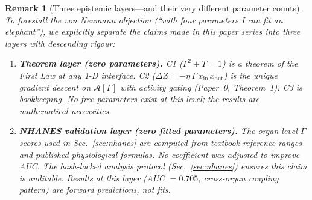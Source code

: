 \documentclass[aps,pre,twocolumn,superscriptaddress,floatfix]{revtex4-2}
\newtheorem{remark}{Remark}
\begin{document}
\begin{remark}[Three epistemic layers---and their
  very different parameter counts]
\label{rem:epistemic-layers}
To forestall the von Neumann objection
(``with four parameters I can fit an elephant''),
we explicitly separate the claims made in this
paper series into three layers with descending
rigour:

\begin{enumerate}
  \item \textbf{Theorem layer (zero parameters).}
    C1 ($\Gamma^2 + T = 1$) is a theorem of the
    First Law at any 1-D interface.
    C2 ($\Delta Z = -\eta\,\Gamma\,x_{\text{in}}\,
    x_{\text{out}}$) is the unique gradient descent
    on $\mathcal{A}[\Gamma]$ with activity gating
    (Paper~0, Theorem~1).
    C3 is bookkeeping.
    No free parameters exist at this level;
    the results are mathematical necessities.

  \item \textbf{NHANES validation layer
    (zero fitted parameters).}
    The organ-level $\Gamma$ scores used in
    Sec.~\ref{sec:nhanes} are computed from
    textbook reference ranges and published
    physiological formulas.
    No coefficient was adjusted to improve AUC.
    The hash-locked analysis protocol
    (Sec.~\ref{sec:nhanes}) ensures this claim
    is auditable.
    Results at this layer (AUC $= 0.705$,
    cross-organ coupling pattern) are
    \emph{forward predictions}, not fits.


\end{enumerate}
\end{remark}
\end{document}
